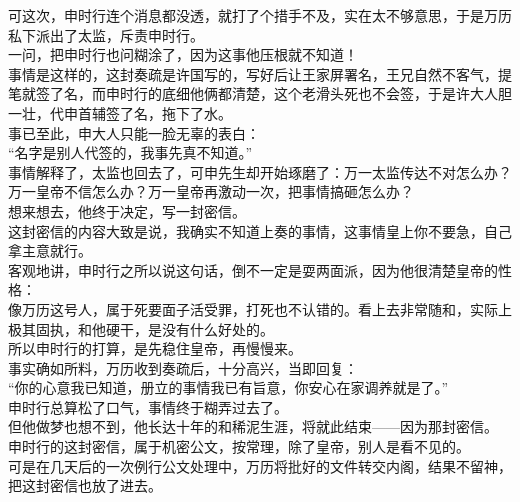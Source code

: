 \begin{multicols}{\theparacolNo}
可这次，申时行连个消息都没透，就打了个措手不及，实在太不够意思，于是万历私下派出了太监，斥责申时行。\\

一问，把申时行也问糊涂了，因为这事他压根就不知道！\\

事情是这样的，这封奏疏是许国写的，写好后让王家屏署名，王兄自然不客气，提笔就签了名，而申时行的底细他俩都清楚，这个老滑头死也不会签，于是许大人胆一壮，代申首辅签了名，拖下了水。\\

事已至此，申大人只能一脸无辜的表白：\\

“名字是别人代签的，我事先真不知道。”\\

事情解释了，太监也回去了，可申先生却开始琢磨了：万一太监传达不对怎么办？万一皇帝不信怎么办？万一皇帝再激动一次，把事情搞砸怎么办？\\

想来想去，他终于决定，写一封密信。\\

这封密信的内容大致是说，我确实不知道上奏的事情，这事情皇上你不要急，自己拿主意就行。\\

客观地讲，申时行之所以说这句话，倒不一定是耍两面派，因为他很清楚皇帝的性格：\\

像万历这号人，属于死要面子活受罪，打死也不认错的。看上去非常随和，实际上极其固执，和他硬干，是没有什么好处的。\\

所以申时行的打算，是先稳住皇帝，再慢慢来。\\

事实确如所料，万历收到奏疏后，十分高兴，当即回复：\\

“你的心意我已知道，册立的事情我已有旨意，你安心在家调养就是了。”\\

申时行总算松了口气，事情终于糊弄过去了。\\

但他做梦也想不到，他长达十年的和稀泥生涯，将就此结束——因为那封密信。\\

申时行的这封密信，属于机密公文，按常理，除了皇帝，别人是看不见的。\\

可是在几天后的一次例行公文处理中，万历将批好的文件转交内阁，结果不留神，把这封密信也放了进去。\\


\end{multicols}
